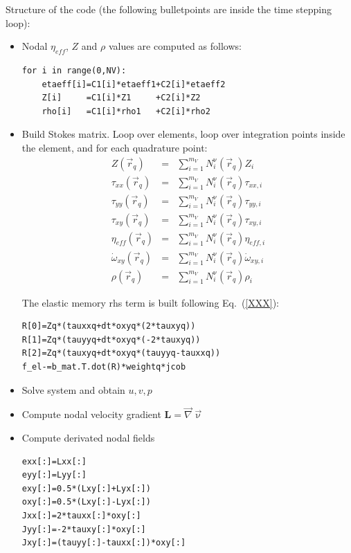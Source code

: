 Structure of the code (the following bulletpoints are inside the time stepping loop):

\begin{itemize}
\item Nodal $\eta_{eff}$, $Z$ and $\rho$ values are computed as follows:
\begin{lstlisting}
for i in range(0,NV):
    etaeff[i]=C1[i]*etaeff1+C2[i]*etaeff2
    Z[i]     =C1[i]*Z1     +C2[i]*Z2
    rho[i]   =C1[i]*rho1   +C2[i]*rho2
\end{lstlisting}

\item Build Stokes matrix. 
Loop over elements, loop over integration points inside the element, and for 
each quadrature point:
\begin{eqnarray}
Z(\vec{r}_q) &=& \sum_{i=1}^{m_V} N_i^\upnu(\vec{r}_q) Z_i \\
\tau_{xx}(\vec{r}_q)&=& \sum_{i=1}^{m_V} N_i^\upnu(\vec{r}_q) \tau_{xx,i} \\
\tau_{yy}(\vec{r}_q)&=& \sum_{i=1}^{m_V} N_i^\upnu(\vec{r}_q) \tau_{yy,i} \\
\tau_{xy}(\vec{r}_q)&=& \sum_{i=1}^{m_V} N_i^\upnu(\vec{r}_q) \tau_{xy,i} \\
\eta_{eff}(\vec{r}_q)&=& \sum_{i=1}^{m_V} N_i^\upnu(\vec{r}_q) \eta_{eff,i} \\
\dot{\omega}_{xy}(\vec{r}_q) &=& \sum_{i=1}^{m_V} N_i^\upnu(\vec{r}_q)  \dot{\omega}_{xy,i} \\
\rho(\vec{r}_q) &=& \sum_{i=1}^{m_V} N_i^\upnu(\vec{r}_q) \rho_i 
\end{eqnarray}


The elastic memory rhs term is built following Eq.~(\ref{XXX}):
\begin{lstlisting}
R[0]=Zq*(tauxxq+dt*oxyq*(2*tauxyq))
R[1]=Zq*(tauyyq+dt*oxyq*(-2*tauxyq))
R[2]=Zq*(tauxyq+dt*oxyq*(tauyyq-tauxxq))
f_el-=b_mat.T.dot(R)*weightq*jcob
\end{lstlisting}

\item Solve system and obtain $u,v,p$

\item Compute nodal velocity gradient ${\bm L}=\vec\nabla\vec\upnu$

\item Compute derivated nodal fields 

\begin{lstlisting}
exx[:]=Lxx[:]
eyy[:]=Lyy[:]
exy[:]=0.5*(Lxy[:]+Lyx[:])
oxy[:]=0.5*(Lxy[:]-Lyx[:])
Jxx[:]=2*tauxx[:]*oxy[:]
Jyy[:]=-2*tauxy[:]*oxy[:]
Jxy[:]=(tauyy[:]-tauxx[:])*oxy[:]
\end{lstlisting}


\end{itemize}
